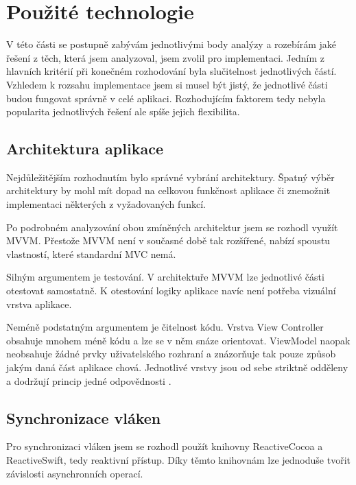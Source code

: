 \section{Použité technologie}

V této části se postupně zabývám jednotlivými body analýzy a rozebírám jaké řešení z těch, která jsem analyzoval, jsem zvolil pro implementaci.
Jedním z hlavních kritérií při konečném rozhodování byla slučitelnost jednotlivých částí.
Vzhledem k rozsahu implementace jsem si musel být jistý, že jednotlivé části budou fungovat správně v celé aplikaci.
Rozhodujícím faktorem tedy nebyla popularita jednotlivých řešení ale spíše jejich flexibilita.

\subsection{Architektura aplikace}\label{technologie-architektura}

Nejdůležitějším rozhodnutím bylo správné vybrání architektury.
Špatný výběr architektury by mohl mít dopad na celkovou funkčnost aplikace či znemožnit implementaci některých z vyžadovaných funkcí.

Po podrobném analyzování obou zmíněných architektur jsem se rozhodl využít MVVM.
Přestože MVVM není v současné době tak rozšířené, nabízí spoustu vlastností, které standardní MVC nemá.

Silným argumentem je testování.
V architektuře MVVM lze jednotlivé části otestovat samostatně.
K otestování logiky aplikace navíc není potřeba vizuální vrstva aplikace.

Neméně podstatným argumentem je čitelnost kódu.
Vrstva View Controller obsahuje mnohem méně kódu a lze se v něm snáze orientovat.
ViewModel naopak neobsahuje žádné prvky uživatelského rozhraní a znázorňuje tak pouze způsob jakým daná část aplikace chová.
Jednotlivé vrstvy jsou od sebe striktně odděleny a dodržují princip jedné odpovědnosti \cite{toptal-srp}.


\subsection{Synchronizace vláken}

Pro synchronizaci vláken jsem se rozhodl použít knihovny ReactiveCocoa a ReactiveSwift, tedy reaktivní přístup.
Díky těmto knihovnám lze jednoduše tvořit závislosti asynchronních operací.


